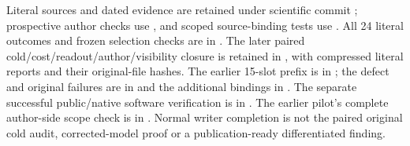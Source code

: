 \begingroup\raggedright
Literal sources and dated evidence are retained under scientific commit
; prospective author checks use , and scoped
source-binding tests use . All 24 literal outcomes and frozen
selection checks are in
.
The later paired cold/cost/readout/author/visibility closure is retained in
, with
compressed literal reports and their original-file hashes.
The earlier 15-slot prefix is in
;
the defect and original failures are in
and the additional bindings in
.
The separate successful public/native software verification is in
.
The earlier pilot's complete author-side scope check is in
.
Normal writer completion is not the paired original cold audit, corrected-model
proof or a publication-ready differentiated finding.
\par\endgroup
\FloatBarrier
